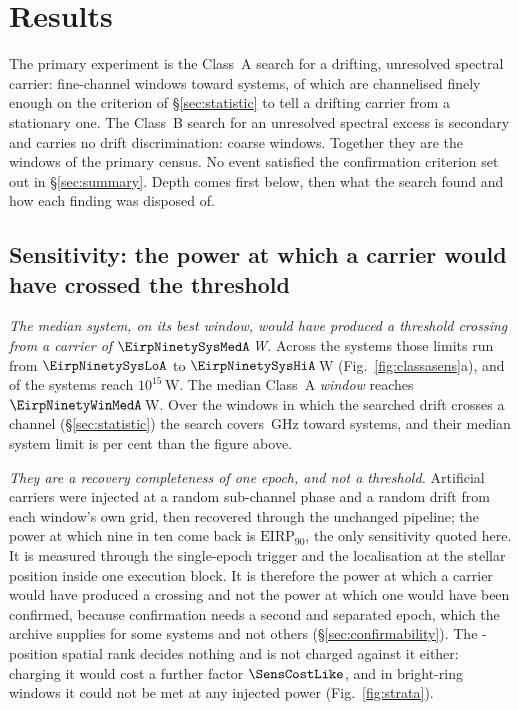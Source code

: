 \section{Results}
\label{sec:results}

The primary experiment is the Class~A search for a drifting, unresolved
spectral carrier: \NWinA{} fine-channel windows toward \NSysClassA{}
systems, \EdrNWinA{} of which are channelised finely enough on the criterion
of \S\ref{sec:statistic} to tell a drifting carrier from a stationary one.
The Class~B search for an unresolved spectral excess is secondary
and carries no drift discrimination: \NWinB{} coarse windows. Together they
are the \NWindows{} windows of the primary census. No event
satisfied the confirmation criterion set out in \S\ref{sec:summary}. Depth
comes first below, then what the search found and how each finding was
disposed of.

\subsection{Sensitivity: the power at which a carrier would have crossed
the threshold} \label{sec:pninetysel}

\emph{The median system, on its best window, would have produced a threshold
crossing from a carrier of $\EirpNinetySysMedA$\,W.} Across the \NSysClassA{} systems those limits
run from $\EirpNinetySysLoA$ to $\EirpNinetySysHiA$\,W
(Fig.~\ref{fig:classasens}a), and \NSysEfifteen{} of the systems reach
$10^{15}$\,W. The median Class~A \emph{window} reaches
$\EirpNinetyWinMedA$\,W.
Over the \EdrNWinA{} windows in which the searched drift crosses a channel
(\S\ref{sec:statistic}) the search covers \EdrUnionGHz\,GHz toward
\EdrNSys{} systems, and their median system limit is \ScEdrMedPct{} per cent
\ScEdrMedSense{} than the figure above.

\emph{They are a recovery completeness of one epoch, and not a threshold.}
Artificial carriers were injected at a random sub-channel phase and a random
drift from each window's own grid, then recovered through the unchanged
pipeline; the power at which nine in ten come back is
$\mathrm{EIRP}_{90}$, the only sensitivity quoted here. It is measured
through the single-epoch trigger and the localisation at the stellar position
inside one execution block. It is therefore the power at which a
carrier would have produced a crossing and not the power at which one would
have been confirmed, because confirmation needs a second and separated epoch, which the archive
supplies for some systems and not others (\S\ref{sec:confirmability}). The \NCtrl-position spatial rank
decides nothing and is not charged against it either: charging it would cost
a further factor $\SensCostLike$, and in \SensNRingHiUnres{} bright-ring
windows it could not be met at any injected power (Fig.~\ref{fig:strata}).

